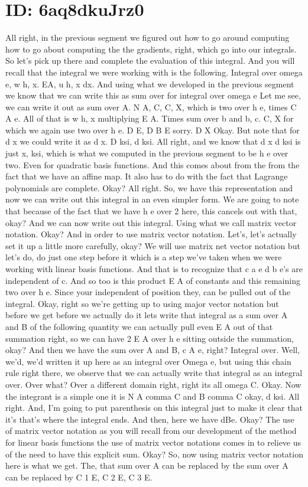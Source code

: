 \documentclass[10pt]{article}
\begin{document}
\section*{ID: 6aq8dkuJrz0}
All right, in the previous segment we figured out how to go around computing how to go about computing the the gradients, right, which go into our integrals. So let's pick up there and complete the evaluation of this integral. And you will recall that the integral we were working with is the following. Integral over omega e, w h, x. EA, u h, x dx. And using what we developed in the previous segment we know that we can write this as sum over for integral over omega e Let me see, we can write it out as sum over A. N A, C, C, X, which is two over h e, times C A e. All of that is w h, x multiplying E A. Times sum over b and b, c. C, X for which we again use two over h e. D E, D B E sorry. D X Okay. But note that for d x we could write it as d x. D ksi, d ksi. All right, and we know that d x d ksi is just x, ksi, which is what we computed in the previous segment to be h e over two. Even for quadratic basis functions. And this comes about from the from the fact that we have an affine map. It also has to do with the fact that Lagrange polynomials are complete. Okay? All right. So, we have this representation and now we can write out this integral in an even simpler form. We are going to note that because of the fact that we have h e over 2 here, this cancels out with that, okay? And we can now write out this integral. Using what we call matrix vector notation. Okay? And in order to use matrix vector notation. Let's, let's actually set it up a little more carefully, okay? We will use matrix net vector notation but let's do, do just one step before it which is a step we've taken when we were working with linear basis functions. And that is to recognize that c a e d b e's are independent of c. And so too is this product E A of constants and this remaining two over h e. Since your independent of position they, can be pulled out of the integral. Okay, right so we're getting up to using major vector notation but before we get before we actually do it lets write that integral as a sum over A and B of the following quantity we can actually pull even E A out of that summation right, so we can have 2 E A over h e sitting outside the summation, okay? And then we have the sum over A and B, c A e, right? Integral over. Well, we'd, we'd written it up here as an integral over Omega e, but using this chain rule right there, we observe that we can actually write that integral as an integral over. Over what? Over a different domain right, right its all omega C. Okay. Now the integrant is a simple one it is N A comma C and B comma C okay, d ksi. All right. And, I'm going to put parenthesis on this integral just to make it clear that it's that's where the integral ends. And then, here we have dBe. Okay? The use of matrix vector notation as you will recall from our development of the method for linear basis functions the use of matrix vector notations comes in to relieve us of the need to have this explicit sum. Okay? So, now using matrix vector notation here is what we get. The, that sum over A can be replaced by the sum over A can be replaced by C 1 E, C 2 E, C 3 E. 
\end{document}
